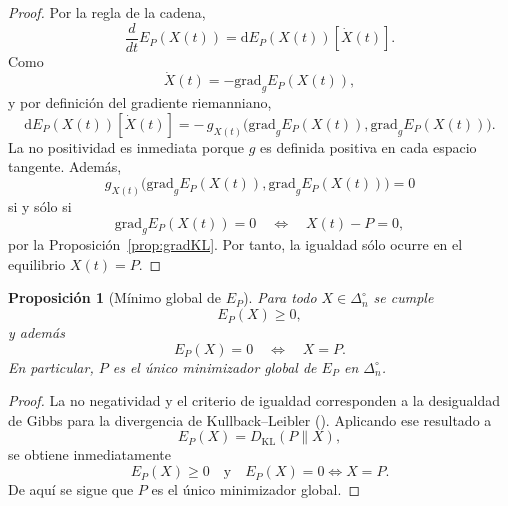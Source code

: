 ﻿\documentclass[12pt]{article}
\newtheorem{proposicion}{Proposición}[section]
\begin{document}
\begin{proof}
Por la regla de la cadena,
\[
\frac{d}{dt}E_P(X(t))
=
\mathrm dE_P(X(t))[\dot X(t)].
\]
Como
\[
\dot X(t)=-\mathrm{grad}_gE_P(X(t)),
\]
y por definición del gradiente riemanniano,
\[
\mathrm dE_P(X(t))[\dot X(t)]
=
-\,g_{X(t)}\!\bigl(\mathrm{grad}_gE_P(X(t)),\mathrm{grad}_gE_P(X(t))\bigr).
\]
La no positividad es inmediata porque $g$ es definida positiva en cada espacio tangente. Además,
\[
g_{X(t)}\!\bigl(\mathrm{grad}_gE_P(X(t)),\mathrm{grad}_gE_P(X(t))\bigr)=0
\]
si y sólo si
\[
\mathrm{grad}_gE_P(X(t))=0
\quad\Longleftrightarrow\quad
X(t)-P=0,
\]
por la Proposición~\ref{prop:gradKL}. Por tanto, la igualdad sólo ocurre en el equilibrio $X(t)=P$.
\end{proof}

\begin{proposicion}[Mínimo global de $E_P$]\label{prop:minimoGlobalKL}
Para todo $X\in\Delta_n^\circ$ se cumple
\[
E_P(X)\ge 0,
\]
y además
\[
E_P(X)=0
\quad\Longleftrightarrow\quad
X=P.
\]
En particular, $P$ es el único minimizador global de $E_P$ en $\Delta_n^\circ$.
\end{proposicion}

\begin{proof}
La no negatividad y el criterio de igualdad corresponden a la desigualdad de Gibbs para la divergencia de Kullback--Leibler (\cite{Csiszar1975,CoverThomas1991}). Aplicando ese resultado a
\[
E_P(X)=D_{\mathrm{KL}}(P\|X),
\]
se obtiene inmediatamente
\[
E_P(X)\ge 0
\quad\text{y}\quad
E_P(X)=0 \Longleftrightarrow X=P.
\]
De aquí se sigue que $P$ es el único minimizador global.
\end{proof}
\end{document}
